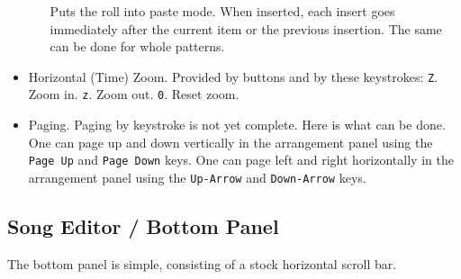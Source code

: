 \begin{itemize}
\begin{itemize}
            Puts the roll into paste mode.
            When inserted, each insert goes immediately
            after the current item or the previous insertion.  The same can be
            done for whole patterns.
         \end{itemize}
      \item Horizontal (Time) Zoom.
         Provided by buttons and by these keystrokes:
         \texttt{Z}. Zoom in.
         \texttt{z}. Zoom out.
         \texttt{0}. Reset zoom.
      \item Paging.  Paging by keystroke is not yet complete.
      Here is what can be done.
      One can page up and down vertically in the arrangement
      panel using the
      \texttt{Page Up} and 
      \texttt{Page Down} keys.
      One can page left and right horizontally in the arrangement
      panel using the
       \texttt{Up-Arrow} and 
       \texttt{Down-Arrow} keys.
   \end{itemize}

\subsection{Song Editor / Bottom Panel}
\label{subsec:song_editor_bottom}

   The bottom panel is simple, consisting of a stock horizontal scroll bar.

\begin{comment}

   and a small button, called the \textbf{Grow} button, labelled with a
   "\textbf{$>$}".

   \index{grow button}
   \index{song editor!grow}
   The \textbf{Grow} button adds to the number of measures that exist
   in the song editor. The visual effect is very subtle, resulting only
   in a small change in the thumb of the horizontal scroll-bar, unless one
   is at the right end of the piano roll.  Then, one can see the added
   measures.  Usually about 128 at a time are added, but this depends on the
   value of PPQN in force.

\end{comment}

